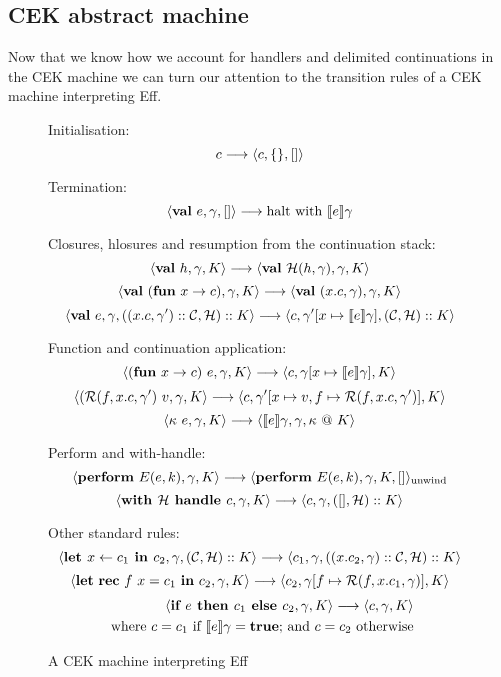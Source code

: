 \documentclass[class=article, crop=false]{standalone}
\begin{document}
\subsection{CEK abstract machine}

Now that we know how we account for handlers and delimited continuations in the CEK
machine we can turn our attention to the transition rules of a CEK machine interpreting Eff.

\begin{figure}
    Initialisation:
    $$ c \longrightarrow \langle c, \{\}, [] \rangle $$
    
    Termination:
    $$ \langle  \mathbf{val}\  e, \gamma, []  \rangle \longrightarrow \text{halt with } \llbracket e \rrbracket\gamma$$
    
    Closures, hlosures and resumption from the continuation stack:
    $$ \langle  \mathbf{val}\  h, \gamma, K \rangle \longrightarrow \langle \mathbf{val}\  \mathcal{H}(h, \gamma), \gamma, K \rangle $$
    $$ \langle  \mathbf{val}\  (\mathbf{fun}\  x \to c), \gamma, K \rangle \longrightarrow \langle \mathbf{val}\  (x.c, \gamma), \gamma, K  \rangle $$
    $$ \langle  \mathbf{val}\  e, \gamma, ((x.c, \gamma') :: \mathcal{C}, \mathcal{H}) :: K  \rangle \longrightarrow
        \langle c, \gamma'[x \mapsto \llbracket e \rrbracket\gamma], (\mathcal{C}, \mathcal{H}) :: K \rangle $$

    Function and continuation application:
    $$ \langle  (\mathbf{fun}\  x \to c)\ e, \gamma, K \rangle \longrightarrow \langle c, \gamma[x \mapsto \llbracket e \rrbracket\gamma], K  \rangle $$
    $$ \langle  (\mathcal{R}(f, x.c, \gamma')\ v, \gamma, K \rangle \longrightarrow \langle c, \gamma'[x \mapsto v, f \mapsto \mathcal{R}(f, x.c, \gamma')], K  \rangle $$
    $$ \langle \kappa\ e, \gamma, K  \rangle \longrightarrow \langle  \llbracket e \rrbracket \gamma, \gamma, \kappa\ @\ K  \rangle $$

    Perform and with-handle:
    $$ \langle  \mathbf{perform}\  E(e,k), \gamma, K  \rangle \longrightarrow \langle  \mathbf{perform}\  E(e,k), \gamma, K, []  \rangle_{\text{unwind}} $$
    $$ \langle  \textbf{with } \mathcal{H} \textbf{ handle } c, \gamma, K  \rangle \longrightarrow \langle  c, \gamma, ([], \mathcal{H}) :: K  \rangle $$

    Other standard rules:
    $$ \langle  \textbf{let } x \leftarrow c_1 \textbf{ in } c_2, \gamma, (\mathcal{C}, \mathcal{H}) :: K \rangle \longrightarrow 
    \langle  c_1, \gamma, ((x. c_2, \gamma) :: \mathcal{C}, \mathcal{H}) :: K  \rangle $$
    $$ \langle \mathbf{let}\  \mathbf{rec}\  f\ x = c_1 \ \mathbf{in}\  c_2, \gamma, K \rangle \longrightarrow
    \langle c_2, \gamma[f \mapsto \mathcal{R}(f, x.c_1, \gamma)], K \rangle $$
    \begin{align*}
    \langle  \textbf{if } e \textbf{ then } c_1 \textbf{ else } c_2, \gamma, K  \rangle \longrightarrow \langle  c, \gamma, K  \rangle \\
    \text{ where $c = c_1$ if $\llbracket e \rrbracket \gamma = \textbf{true}$; and $c = c_2$ otherwise}
    \end{align*}
        

    \caption{A CEK machine interpreting Eff}
    \label{cek-machine}
\end{figure}
\end{document}
